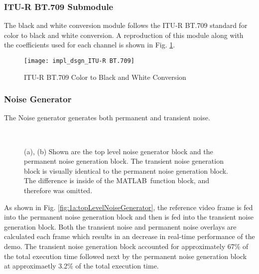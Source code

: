 \subsubsection{ITU-R BT.709 Submodule}
The black and white conversion module follows the ITU-R BT.709 standard for color to black and white conversion. A reproduction of this module along with the coefficients used for each channel is shown in Fig. \ref{fig:btu709}.
\begin{figure}[H]
    \texttt{[image: impl\_dsgn\_ITU-R BT.709]}
    \caption{ITU-R BT.709 Color to Black and White Conversion}
    \label{fig:btu709}
\end{figure}
\subsubsection{Noise Generator}
The Noise generator generates both permanent and transient noise.
\begin{figure}[ht!]
    \\
    \caption{(a), (b) Shown are the top level noise generator block and the permanent noise generation block. The transient noise generation block is visually identical to the permanent noise generation block. The difference is inside of the MATLAB\textregisteredmark\ function block, and therefore was omitted.}
    \label{fig:noiseGenerator}
\end{figure}
\par As shown in Fig. \ref{fig:1a:topLevelNoiseGenerator}, the reference video frame is fed into the permanent noise generation block and then is fed into the transient noise generation block. Both the transient noise and permanent noise overlays are calculated each frame which results in an decrease in real-time performance of the demo. The transient noise generation block accounted for approximately 67\% of the total execution time followed next by the permanent noise generation block at approximaetly 3.2\% of the total execution time.